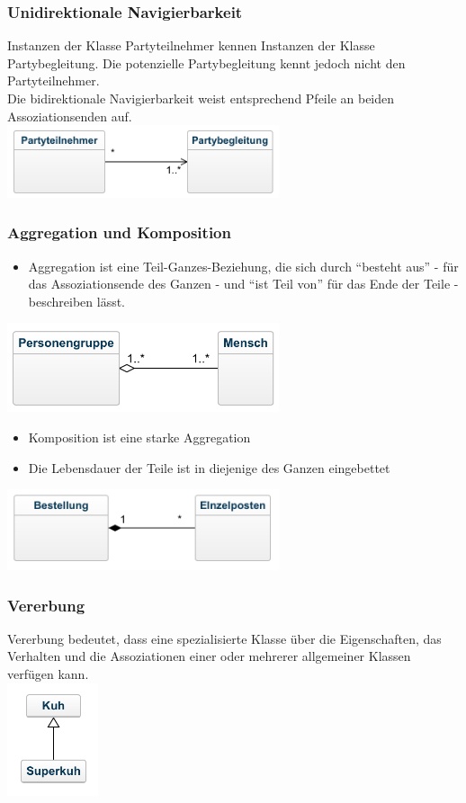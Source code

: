\begin{frame}
\frametitle{Unidirektionale Navigierbarkeit}
	Instanzen der Klasse Partyteilnehmer kennen Instanzen der Klasse
	Partybegleitung. Die potenzielle Partybegleitung kennt jedoch nicht
	den Partyteilnehmer.
	\\
	Die bidirektionale Navigierbarkeit weist entsprechend Pfeile an beiden
	Assoziationsenden auf.
	\\
	\center
	\includegraphics[width=0.6\textwidth,
	keepaspectratio=true]{bilder/asso_navi2.png}
\end{frame}

\begin{frame}
\frametitle{Aggregation und Komposition}
	\begin{itemize}
		\item Aggregation ist eine Teil-Ganzes-Beziehung, die sich durch ``besteht aus''
		- für das Assoziationsende des Ganzen - und ``ist Teil von'' für das Ende der Teile
		- beschreiben lässt.
	\end{itemize}
	\includegraphics[width=0.6\textwidth,
	keepaspectratio=true]{bilder/asso_agg.png}
	\begin{itemize}
		\item Komposition ist eine starke Aggregation
		\item Die Lebensdauer der Teile ist in diejenige des Ganzen eingebettet
	\end{itemize}
	\includegraphics[width=0.6\textwidth,
	keepaspectratio=true]{bilder/asso_comp.png}
\end{frame}

\begin{frame}
\frametitle{Vererbung}
	Vererbung bedeutet, dass eine spezialisierte Klasse über die Eigenschaften,
	das Verhalten und die Assoziationen einer oder mehrerer allgemeiner Klassen
	verfügen kann.
	\\
	\center
	\includegraphics[width=0.2\textwidth,
	keepaspectratio=true]{bilder/asso_vererbung.png}
\end{frame}

